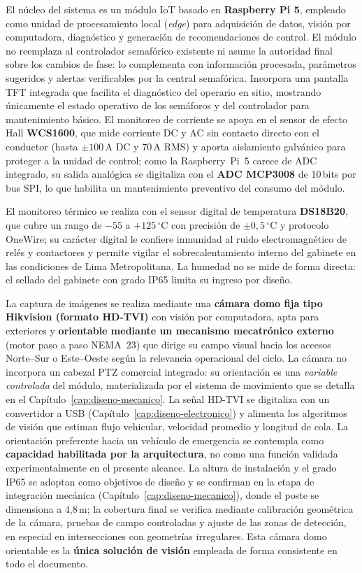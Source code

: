 El núcleo del sistema es un módulo IoT basado en \textbf{Raspberry Pi 5}, empleado como unidad de
procesamiento local (\emph{edge}) para adquisición de datos, visión por computadora, diagnóstico y generación
de recomendaciones de control. El módulo no reemplaza al controlador semafórico existente ni asume la
autoridad final sobre los cambios de fase: lo complementa con información procesada, parámetros sugeridos y
alertas verificables por la central semafórica. Incorpora una pantalla TFT integrada que facilita el
diagnóstico del operario en sitio, mostrando únicamente el estado operativo de los semáforos y del controlador
para mantenimiento básico. El monitoreo de corriente se apoya en el sensor de efecto Hall
\textbf{WCS1600}, que mide corriente DC y AC sin contacto directo con el conductor (hasta $\pm 100$\,A DC y
70\,A RMS) y aporta aislamiento galvánico para proteger a la unidad de control; como la Raspberry~Pi~5 carece
de ADC integrado, su salida analógica se digitaliza con el \textbf{ADC MCP3008} de 10\,bits por bus SPI, lo
que habilita un mantenimiento preventivo del consumo del módulo.

El monitoreo térmico se realiza con el sensor digital de temperatura \textbf{DS18B20}, que cubre un rango de
$-55$ a $+125\,^{\circ}$C con precisión de $\pm 0{,}5\,^{\circ}$C y protocolo OneWire; su carácter digital le
confiere inmunidad al ruido electromagnético de relés y contactores y permite vigilar el sobrecalentamiento
interno del gabinete en las condiciones de Lima Metropolitana. La humedad no se mide de forma directa: el
sellado del gabinete con grado IP65 limita su ingreso por diseño.

La captura de imágenes se realiza mediante una \textbf{cámara domo fija tipo Hikvision (formato HD-TVI)} con
visión por computadora, apta para exteriores y \textbf{orientable mediante un mecanismo mecatrónico externo}
(motor paso a paso NEMA~23) que dirige su campo visual hacia los accesos Norte--Sur o Este--Oeste según la
relevancia operacional del ciclo. La cámara no incorpora un cabezal PTZ comercial integrado: su orientación es
una \emph{variable controlada} del módulo, materializada por el sistema de movimiento que se detalla en el
Capítulo~\ref{cap:diseno-mecanico}. La señal HD-TVI se digitaliza con un convertidor a USB
(Capítulo~\ref{cap:diseno-electronico}) y alimenta los algoritmos de visión que estiman flujo vehicular,
velocidad promedio y longitud de cola. La orientación preferente hacia un vehículo de emergencia se contempla
como \textbf{capacidad habilitada por la arquitectura}, no como una función validada experimentalmente en el
presente alcance. La altura de instalación y el grado IP65 se adoptan como objetivos de diseño y se confirman
en la etapa de integración mecánica (Capítulo~\ref{cap:diseno-mecanico}), donde el poste se dimensiona a
4,8\,m; la cobertura final se verifica mediante calibración geométrica de la cámara, pruebas de campo
controladas y ajuste de las zonas de detección, en especial en intersecciones con geometrías irregulares. Esta
cámara domo orientable es la \textbf{única solución de visión} empleada de forma consistente en todo el
documento.

